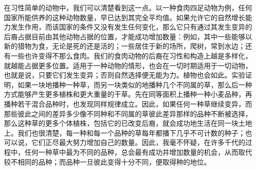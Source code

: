 {在习性简单的动物中，我们可以清楚看到这一点。以一种食肉四足动物为例，任何国家所能供养的这种动物数量，早已达到其完全平均值。如果允许它的自然增长能力发生作用，而该国家的条件又没有发生任何变化，那么它只有通过其发生变异的后裔占据目前由其他动物占据的位置，才能成功增加数量：例如，其中一些能够以新的猎物为食，无论是死的还是活的；一些居住于新的场所，爬树，常到水边；还有一些也许变得不那么食肉。我们的食肉动物的后裔在习性和构造上越是多样化，就越能占据更多位置。适用于一种动物的情形，也会在一切时期适用于一切动物，也就是说，只要它们发生变异；否则自然选择便无能为力。植物也会如此。实验证明，如果一块地播种一种草，而另一块类似的地播种几个不同属的草，那么后一种方式能够产生更多植株和更大重量的干草。先在同等面积上播种一种小麦品种，再播种若干混合品种时，也发现同样规律成立。因此，如果任何一种草继续变异，而那些彼此之间的差异多少像不同种和不同属的草彼此差异那样的品种不断被选择，那么这种草的更多个体植株，包括它的已改变后裔，就会成功地生活在同一块土地上。我们也很清楚，每一种和每一个品种的草每年都播下几乎不可计数的种子；也可以说，它们正尽最大努力增加自己的数量。因此，我毫不怀疑，在许多千代的过程中，任何一种草中最为不同的品种，总会最有成功并增加数量的机会，从而取代较不相同的品种；而品种一旦彼此变得十分不同，便取得种的地位。}


